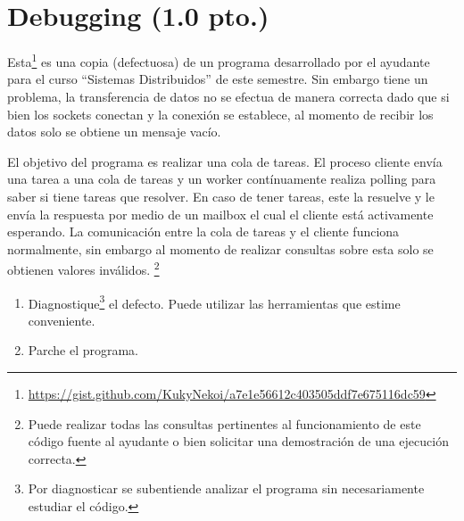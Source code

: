 \documentclass[11pt]{utalcaDoc}
\begin{document}
\section{Debugging (1.0 pto.)}
Esta\footnote{\url{https://gist.github.com/KukyNekoi/a7e1e56612c403505ddf7e675116dc59}} es una copia (defectuosa) de un programa desarrollado por el ayudante para el curso ``Sistemas Distribuidos'' de este semestre. Sin embargo tiene un problema, la transferencia de datos no se efectua de manera correcta dado que si bien los sockets conectan y la conexión se establece, al momento de recibir los datos solo se obtiene un mensaje vacío.

El objetivo del programa es realizar una cola de tareas. El proceso cliente envía una tarea a una cola de tareas y un worker contínuamente realiza polling para saber si tiene tareas que resolver. En caso de tener tareas, este la resuelve y le envía la respuesta por medio de un mailbox el cual el cliente está activamente esperando. La comunicación entre la cola de tareas y el cliente funciona normalmente, sin embargo al momento de realizar consultas sobre esta solo se obtienen valores inválidos. \footnote{Puede realizar todas las consultas pertinentes al funcionamiento de este código fuente al ayudante o bien solicitar una demostración de una ejecución correcta.}

\begin{enumerate}
    \item{ Diagnostique\footnote{Por diagnosticar se subentiende analizar el programa sin necesariamente estudiar el código.} el defecto. Puede utilizar las herramientas que estime conveniente.}
    \item{ Parche el programa. }
\end{enumerate}
\end{document}
